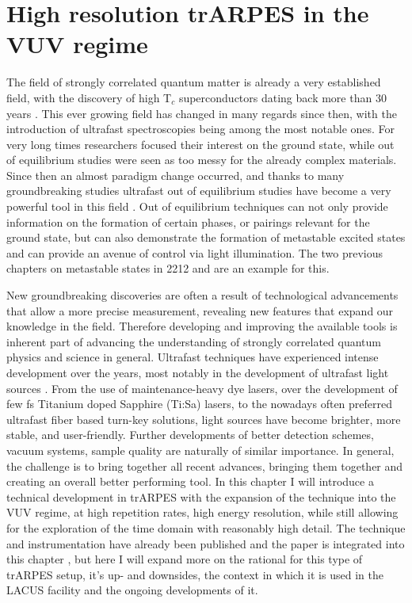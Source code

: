 \chapter{High resolution trARPES in the VUV regime}

The field of strongly correlated quantum matter is already a very established field, with the discovery of high T$_c$ superconductors dating back more than 30 years \cite{anderson_resonating_1987}.
This ever growing field has changed in many regards since then, with the introduction of ultrafast spectroscopies being among the most notable ones.
For very long times researchers focused their interest on the ground state, while out of equilibrium studies were seen as too messy for the already complex materials.
Since then an almost paradigm change occurred, and thanks to many groundbreaking studies \cite{eesley_relaxation_1990, han_femtosecond_1990, giannetti_revealing_2011, smallwood_tracking_2012} ultrafast out of equilibrium studies have become a very powerful tool in this field \cite{orenstein_ultrafast_2012, maiuri_ultrafast_2020, boschini_time-resolved_2024, giannetti_ultrafast_2016, lloyd-hughes_2021_2021}.
Out of equilibrium techniques can not only provide information on the formation of certain phases, or pairings relevant for the ground state, but can also demonstrate the formation of metastable excited states and can provide an avenue of control via light illumination.
The two previous chapters on metastable states in 2212 and  are an example for this.

New groundbreaking discoveries are often a result of technological advancements that allow a more precise measurement, revealing new features that expand our knowledge in the field.
Therefore developing and improving the available tools is inherent part of advancing the understanding of strongly correlated quantum physics and science in general.
Ultrafast techniques have experienced intense development over the years, most notably in the development of ultrafast light sources \cite{keller_recent_2003}.
From the use of maintenance-heavy dye lasers, over the development of few \unit{\femto\second} Titanium doped Sapphire (Ti:Sa) lasers, to the nowadays often preferred ultrafast fiber based turn-key solutions, light sources have become brighter, more stable, and user-friendly.
Further developments of better detection schemes, vacuum systems, sample quality are naturally of similar importance.
In general, the challenge is to bring together all recent advances, bringing them together and creating an overall better performing tool.
In this chapter I will introduce a technical development in trARPES with the expansion of the technique into the VUV regime, at high repetition rates, high energy resolution, while still allowing for the exploration of the time domain with reasonably high detail.
The technique and instrumentation have already been published and the paper is integrated into this chapter \cite{hellbruck_high-resolution_2024}, but here I will expand more on the rational for this type of trARPES setup, it's up- and downsides, the context in which it is used in the LACUS facility and the ongoing developments of it.

